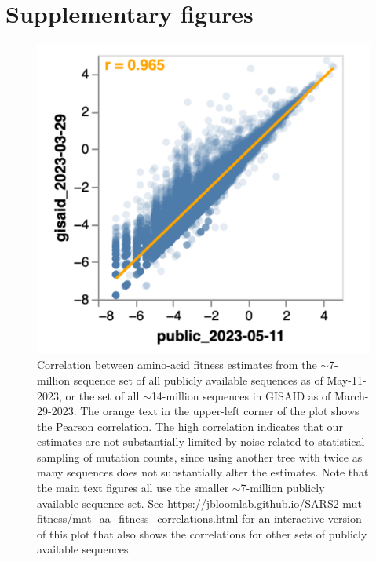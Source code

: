 \documentclass[9pt,twocolumn,twoside]{gsajnl_modified}
\begin{document}
\clearpage

\section{Supplementary figures}

\begin{figure}[h]
\centering
\includegraphics[width=0.4\linewidth]{figs/gisaid_corr.png}
\caption{
Correlation between amino-acid fitness estimates from the $\sim$7-million sequence set of all publicly available sequences as of May-11-2023, or the set of all $\sim$14-million sequences in GISAID as of March-29-2023.
The orange text in the upper-left corner of the plot shows the Pearson correlation.
The high correlation indicates that our estimates are not substantially limited by noise related to statistical sampling of mutation counts, since using another tree with twice as many sequences does not substantially alter the estimates.
Note that the main text figures all use the smaller $\sim$7-million publicly available sequence set.
See \url{https://jbloomlab.github.io/SARS2-mut-fitness/mat_aa_fitness_correlations.html} for an interactive version of this plot that also shows the correlations for other sets of publicly available sequences.
\label{fig:gisaid_corr}
}
\end{figure}
\end{document}
